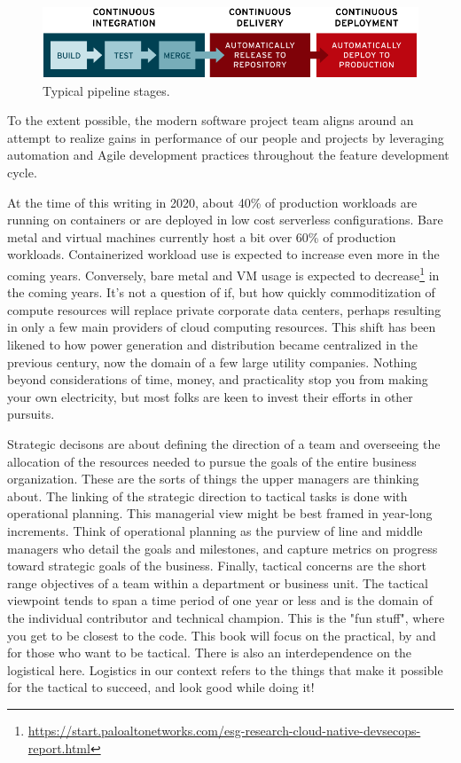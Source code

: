 \begin{figure}[!htb]
	\centering
	\includegraphics[scale=0.35]{../images/ci-cd-flow-desktop_0.png}
	\caption{Typical pipeline stages.}
	\label{fig:stages}
\end{figure}

\justify
To the extent possible, the modern software project team aligns around an
attempt to realize gains in performance of our people and projects by 
leveraging automation and Agile development practices throughout the 
feature development cycle.

\justify
At the time of this writing in 2020, about 40\% of production workloads are
running on containers or are deployed in low cost serverless configurations.
Bare metal and virtual machines currently host a bit over 60\% of production
workloads. Containerized workload use is expected to increase even more in
the coming years. Conversely, bare metal and VM usage is expected to
decrease\footnote{\url{https://start.paloaltonetworks.com/esg-research-cloud-native-devsecops-report.html}}
in the coming years.
It's not a question of if, but how quickly commoditization of compute resources
will replace private corporate data centers, perhaps resulting in only a
few main providers of cloud computing resources. This shift has been likened 
to how power generation and distribution became centralized
in the previous century, now the domain of a few large utility companies.
Nothing beyond considerations of time, money, and practicality stop you
from making your own electricity, but most folks are keen to invest their
efforts in other pursuits.

\justify
Strategic decisons are about defining the direction of a team and overseeing 
the allocation of the resources needed to pursue the goals of the entire 
business organization. These are the sorts of things the upper managers are
thinking about. The linking of the strategic direction to tactical tasks is 
done with operational planning. This managerial view might be best framed in
year-long increments. Think of operational planning as the purview of line
and middle managers who detail the goals and milestones, and capture metrics
on progress toward strategic goals of the business. Finally, tactical concerns
are the short range objectives of a team within a department or business unit.
The tactical viewpoint tends to span a time period of one year or less and is
the domain of the individual contributor and technical champion. This is the
"fun stuff", where you get to be closest to the code. This book will focus 
on the practical, by and for those who want to be tactical. There is also 
an interdependence on the logistical here. Logistics in our context refers to
the things that make it possible for the tactical to succeed, and look good 
while doing it!


